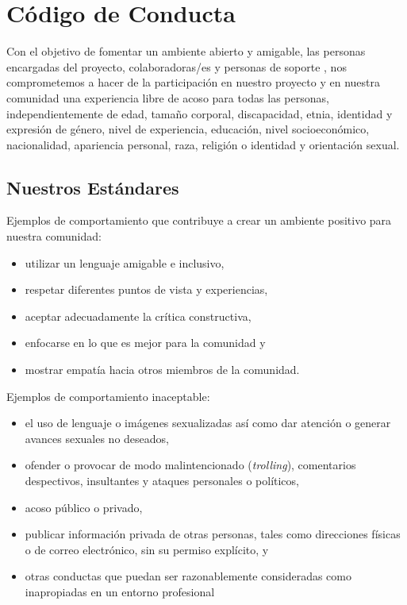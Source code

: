 \chapter{Código de Conducta}\label{s:conduct}

Con el objetivo de fomentar un ambiente abierto y amigable, 
las personas encargadas del proyecto, colaboradoras/es y personas de soporte , 
nos comprometemos a hacer de la participación en nuestro proyecto
y en nuestra comunidad una experiencia libre de acoso para todas las personas,
independientemente de edad, tamaño corporal, discapacidad, etnia,
identidad y expresión de género, nivel de experiencia, educación,
nivel socioeconómico, nacionalidad, apariencia personal, raza,
religión o identidad y orientación sexual.

\section*{Nuestros Estándares}

Ejemplos de comportamiento que contribuye a crear un ambiente positivo
para nuestra comunidad:

\begin{itemize}
\item
  utilizar un lenguaje amigable e inclusivo,
\item
  respetar diferentes puntos de vista y experiencias,
\item
  aceptar adecuadamente la crítica constructiva,
\item
 enfocarse en lo que es mejor para la comunidad y
\item
 mostrar empatía hacia otros miembros de la comunidad.
\end{itemize}

\noindent
Ejemplos de comportamiento inaceptable:

\begin{itemize}
\item
  el uso de lenguaje o imágenes sexualizadas así como  
  dar atención o generar avances sexuales no deseados,
\item
  ofender o provocar de modo malintencionado (\emph{trolling}), comentarios despectivos, insultantes y ataques personales o políticos,
\item
 acoso  público o privado,
\item
  publicar información privada de otras personas, tales como direcciones
  físicas o de correo electrónico, sin su permiso explícito, y
\item
  otras conductas que puedan ser razonablemente consideradas
  como inapropiadas en un entorno profesional
\end{itemize}

